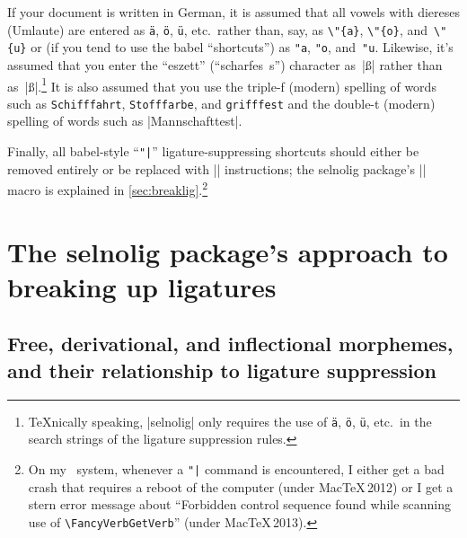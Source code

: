 \documentclass[11pt]{article}
\newcommand{\pkg}[1]{\textsf{#1}}
\newcommand{\cmmd}[1]{\texttt{\textbackslash #1}}
\begin{document}
If your document is written in German, it is assumed that all vowels with diereses (Umlaute) are entered as \Verb|ä|, \Verb|ö|, \Verb|ü|, etc.\ rather than, say, as \Verb|\"{a}|, \Verb|\"{o}|, and~\Verb|\"{u}| or (if you tend to use the \pkg{babel} \enquote{shortcuts}) as \Verb|"a|, \Verb|"o|, and~\Verb|"u|. Likewise, it's assumed that you enter the \enquote{eszett} (\enquote{scharfes~s}) character as~|ß| rather than as~|\ss|.\footnote{\TeX nically speaking, |selnolig| only requires the use of \Verb|ä|, \Verb|ö|, \Verb|ü|, etc.\ in the search strings of the ligature suppression rules.} It is also assumed that you use the triple-f (modern) spelling of words such as \texttt{Schifffahrt}, \texttt{Stofffarbe}, and \texttt{grifffest} and the double-t (modern) spelling of words such as |Mannschafttest|.

Finally, all \pkg{babel}-style ``\Verb+"|+'' ligature-suppressing shortcuts should either be removed entirely or be replaced with |\breaklig| instructions; the \pkg{selnolig} package's |\breaklig| macro is explained in \cref{sec:breaklig}.\footnote{On my \LuaLaTeX\ system, whenever a \Verb+"|+ command is encountered, I either get a bad crash that requires a reboot of the computer (under Mac\TeX\,2012) or I get a stern error message about \enquote{Forbidden control sequence found while scanning use of \cmmd{FancyVerbGetVerb}} (under Mac\TeX\,2013).}





\section[The selnolig package's approach to breaking up ligatures]{The \pkg{selnolig} package's approach to breaking up ligatures} \label{sec:approach}

\subsection[Free, derivational, and inflectional morphemes]{Free, derivational, and inflectional morphemes, and their relationship to ligature suppression}
\end{document}
